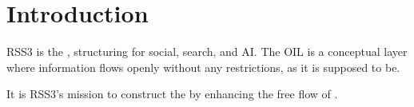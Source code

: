 \section{Introduction}

RSS3 is the , structuring  for social, search, and AI.
The \gls{OIL} is a conceptual layer where information flows openly without any restrictions, as it is supposed to be.

It is RSS3's mission to construct the  by enhancing the free flow of .

